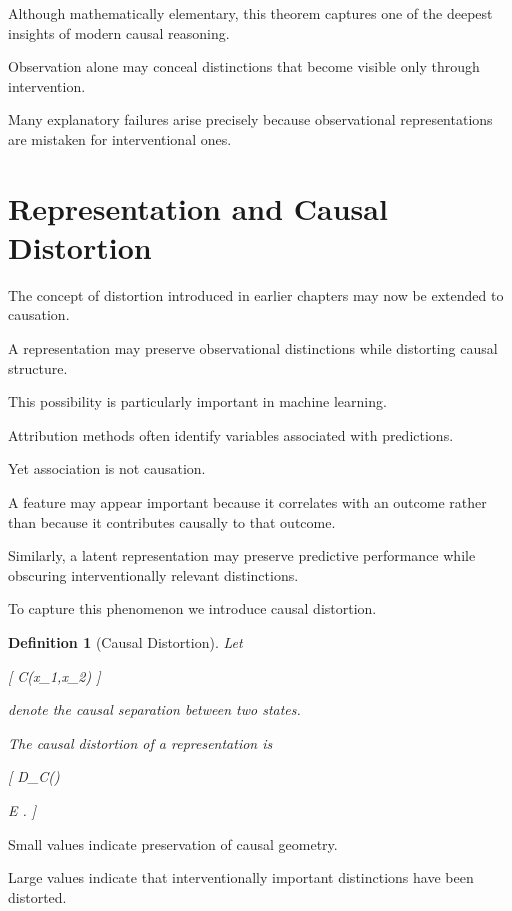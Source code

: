 \documentclass[11pt,oneside,openany]{book}
\newtheorem{definition}{Definition}[chapter] \newtheorem{theorem}{Theorem}[chapter] \newtheorem{proposition}{Proposition}[chapter] \newtheorem{lemma}{Lemma}[chapter] \newtheorem{corollary}{Corollary}[chapter] \newtheorem{remark}{Remark}[chapter]
\begin{document}
Although mathematically elementary, this theorem captures one of the deepest insights of modern causal reasoning.

Observation alone may conceal distinctions that become visible only through intervention.

Many explanatory failures arise precisely because observational representations are mistaken for interventional ones.

\section{Representation and Causal Distortion}

The concept of distortion introduced in earlier chapters may now be extended to causation.

A representation may preserve observational distinctions while distorting causal structure.

This possibility is particularly important in machine learning.

Attribution methods often identify variables associated with predictions.

Yet association is not causation.

A feature may appear important because it correlates with an outcome rather than because it contributes causally to that outcome.

Similarly, a latent representation may preserve predictive performance while obscuring interventionally relevant distinctions.

To capture this phenomenon we introduce causal distortion.

\begin{definition}[Causal Distortion]

Let

[
C(x_1,x_2)
]

denote the causal separation between two states.

The causal distortion of a representation is

[
D_C(\pi)

\mathbb E
.
]

\end{definition}

Small values indicate preservation of causal geometry.

Large values indicate that interventionally important distinctions have been distorted.
\end{document}
